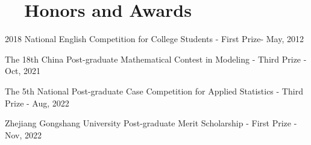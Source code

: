 \documentclass[a4paper,20pt]{article}
\begin{document}
\section{~~Honors and Awards}
\begin{description}[font=$\bullet$]
  \item {2018 National English Competition for College Students - First Prize- May, 2012}
  \vspace{-5pt}
  \item {The 18th China Post-graduate Mathematical Contest in Modeling - Third Prize - Oct, 2021}
  \vspace{-5pt}
  \item {The 5th National Post-graduate Case Competition for Applied Statistics - Third Prize - Aug, 2022}
  \vspace{-5pt}
  \item {Zhejiang Gongshang University Post-graduate Merit Scholarship - First Prize - Nov, 2022}

\end{description}
\end{document}
